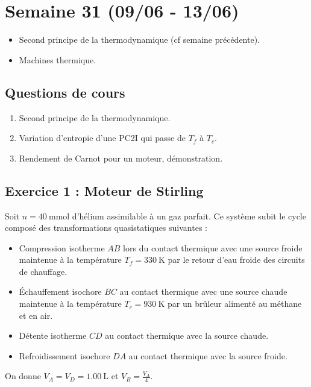 \section{Semaine 31 (09/06 - 13/06) }


\begin{itemize}
	\item Second principe de la thermodynamique (cf semaine précédente).
	\item Machines thermique.
\end{itemize}

\subsection{Questions de cours}

\begin{enumerate}
	\item Second principe de la thermodynamique.
	\item Variation d'entropie d'une PC2I qui passe de $T_f$ à $T_c$.
	\item Rendement de Carnot pour un moteur, démonstration. 
\end{enumerate}

\subsection{Exercice 1 :  Moteur de Stirling}

Soit $n = \SI{40}{\milli\mole}$ d'hélium assimilable à un gaz parfait. Ce système subit le cycle composé des transformations quasistatiques suivantes :

\begin{itemize}
	\item Compression isotherme $AB$ lors du contact thermique avec une source froide maintenue à la température $T_f = \SI{330}{\kelvin}$ par le retour d'eau froide des circuits de chauffage.
	\item Échauffement isochore $BC$ au contact thermique avec une source chaude maintenue à la température $T_c = \SI{930}{\kelvin}$ par un brûleur alimenté au méthane et en air.
	\item Détente isotherme $CD$ au contact thermique avec la source chaude.
	\item Refroidissement isochore $DA$ au contact thermique avec la source froide.
\end{itemize}

On donne $V_A = V_D = \SI{1.00}{\liter}$ et $V_B = \frac{V_A}{4}$.

